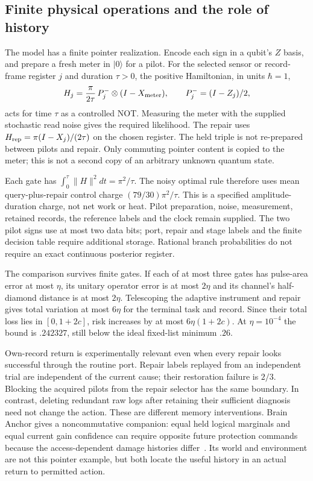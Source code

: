 \documentclass[12pt]{article}
\theoremstyle{definition}
\theoremstyle{remark}
\begin{document}
\subsection{Finite physical operations and the role of history}

The model has a finite pointer realization. Encode each sign in a
qubit's $Z$ basis, and prepare a fresh meter in $|0\rangle$ for a pilot.
For the selected sensor or record-frame register $j$ and duration
$\tau>0$, the positive Hamiltonian, in units $\hbar=1$,
\[
 H_j=\frac{\pi}{2\tau}\,P_j^-\otimes(I-X_{\rm meter}),
 \qquad P_j^-=(I-Z_j)/2,
\]
acts for time $\tau$ as a controlled NOT. Measuring the meter with
the supplied stochastic read noise gives the required likelihood.
The repair uses $H_{\rm rep}=\pi(I-X_j)/(2\tau)$ on the chosen
register. The held triple is not re-prepared between pilots and repair.
Only commuting pointer content is copied to the meter; this is not
a second copy of an arbitrary unknown quantum state.

Each gate has $\int_0^\tau\|H\|^2dt=\pi^2/\tau$. The noisy optimal
rule therefore uses mean query-plus-repair control charge
$(79/30)\pi^2/\tau$. This is a specified amplitude-duration charge,
not net work or heat. Pilot preparation, noise, measurement, retained
records, the reference labels and the clock remain supplied.
The two pilot signs use at most two data bits; port, repair and
stage labels and the finite decision table require additional
storage. Rational branch probabilities do not require an exact
continuous posterior register.

The comparison survives finite gates. If each of at most three
gates has pulse-area error at most $\eta$, its unitary operator
error is at most $2\eta$ and its channel's half-diamond distance
is at most $2\eta$. Telescoping the adaptive instrument and repair
gives total variation at most $6\eta$ for the terminal task and
record. Since their total loss lies in $[0,1+2c]$, risk increases
by at most $6\eta(1+2c)$. At $\eta=10^{-4}$ the bound is
$.242327$, still below the ideal fixed-list minimum $.26$.

Own-record return is experimentally relevant even when every repair
looks successful through the routine port. Repair labels replayed
from an independent trial are independent of the current cause;
their restoration failure is $2/3$. Blocking the acquired pilots
from the repair selector has the same boundary. In contrast,
deleting redundant raw logs after retaining their sufficient
diagnosis need not change the action. These are different memory
interventions. Brain Anchor gives a noncommutative companion:
equal held logical marginals and equal current gain confidence
can require opposite future protection commands because the
access-dependent damage histories differ~\cite{BrainAnchor}.
Its world and environment are not this pointer example, but both
locate the useful history in an actual return to permitted action.
\end{document}
